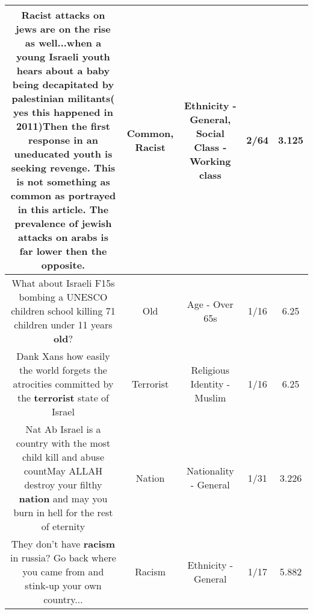 \documentclass[11pt]{article}
\newlength\mylength
\begin{document}
\begin{center}
\begin{longtable}{|C{.65\mylength}|C{.30\mylength}|C{.12\mylength}|C{.12\mylength}|C{.12\mylength}|}
  \small Racist attacks on jews are on the rise as well...when a young Israeli youth hears about a baby being decapitated by palestinian militants( yes this happened in 2011)Then the first response in an uneducated youth is seeking revenge. This is not something as \textbf{common} as portrayed in this article. The prevalence of jewish attacks on arabs is far lower then the opposite.\normalsize   & Common, Racist & Ethnicity - General, Social Class - Working class & 2/64 & 3.125 \\  \hline
  \small What about Israeli F15s bombing a UNESCO children school killing 71 children under 11 years \textbf{old}?\normalsize   & Old & Age - Over 65s & 1/16 & 6.25 \\  \hline
  \small Dank Xans how easily the world forgets the atrocities committed by the \textbf{terrorist} state of Israel\normalsize   & Terrorist & Religious Identity - Muslim & 1/16 & 6.25 \\  \hline
  \small Nat Ab Israel is a country with the most child kill and abuse countMay ALLAH destroy your filthy \textbf{nation} and may you burn in hell for the rest of eternity\normalsize   & Nation & Nationality - General & 1/31 & 3.226 \\  \hline
  \small They don't have \textbf{racism} in russia? Go back where you came from and stink-up your own country...\normalsize   & Racism & Ethnicity - General & 1/17 & 5.882 \\  \hline

\end{longtable}
\end{center}
\end{document}
